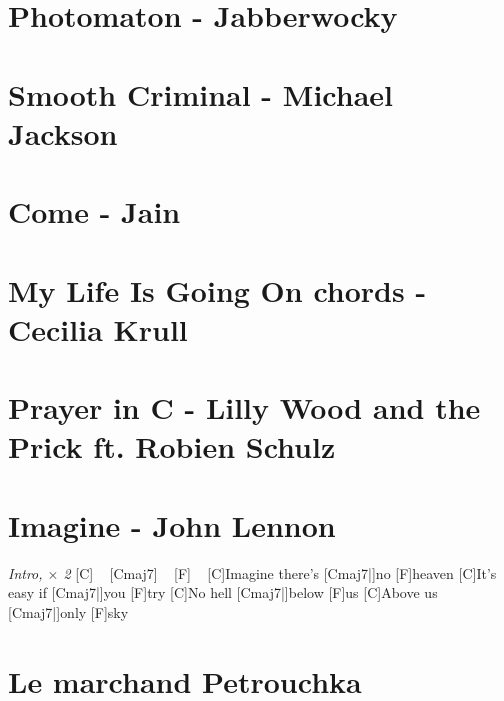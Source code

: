 \documentclass{guitartabs}
\begin{document}
\section{Photomaton - Jabberwocky}
\begin{guitar}

\end{guitar}

\section{Smooth Criminal - Michael Jackson}
\begin{guitar}

\end{guitar}

\section{Come - Jain}
\begin{guitar}

\end{guitar}



\section{My Life Is Going On chords - Cecilia Krull }
\begin{guitar}

\end{guitar}

\section{Prayer in C - Lilly Wood and the Prick ft. Robien Schulz}




\section{Imagine - John Lennon}

\begin{guitar}
\emph{Intro, $\times$ 2}%
[C] ~ [Cmaj7]  ~ [F]  ~  %
[C]Imagine there's [Cmaj7|]{no} [F]heaven
[C]It's easy if [Cmaj7|]{you} [F]try
[C]No hell [Cmaj7|]{below} [F]us
[C]Above us [Cmaj7|]{only} [F]sky
\end{guitar}


\section{Le marchand Petrouchka}
\begin{guitar}

\end{guitar}
\end{document}

